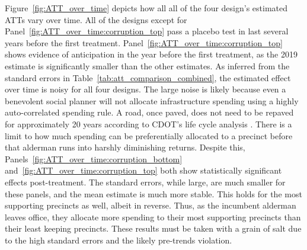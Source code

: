 Figure~\ref{fig:ATT_over_time} depicts how all all of the four design's estimated ATTs vary over time.
All of the designs except for Panel~\ref{fig:ATT_over_time:corruption_top}  pass a placebo test in last several years before the first treatment.
Panel~\ref{fig:ATT_over_time:corruption_top} shows evidence of anticipation in the year before the first treatment, as the 2019 estimate is significantly smaller than the other estimates.
As inferred from the standard errors in Table~\ref{tab:att_comparison_combined}, the estimated effect over time is noisy for all four designs.
The large noise is likely because even a benevolent social planner will not allocate infrastructure spending using a highly auto-correlated spending rule.
A road, once paved, does not need to be repaved for approximately 20 years according to CDOT's life cycle analysis \citep{OIGaudit}.
There is a limit to how much spending can be preferentially allocated to a precinct before that alderman runs into harshly diminishing returns.
Despite this, Panels~\ref{fig:ATT_over_time:corruption_bottom} and~\ref{fig:ATT_over_time:corruption_top} both show statistically significant effects post-treatment.
The standard errors, while large, are much smaller for these panels, and the mean estimate is much more stable.
This holds for the most supporting precincts as well, albeit in reverse.
Thus, as the incumbent alderman leaves office, they allocate more spending to their most supporting precincts than their least keeping precincts.
These results must be taken with a grain of salt due to the high standard errors and the likely pre-trends violation.

